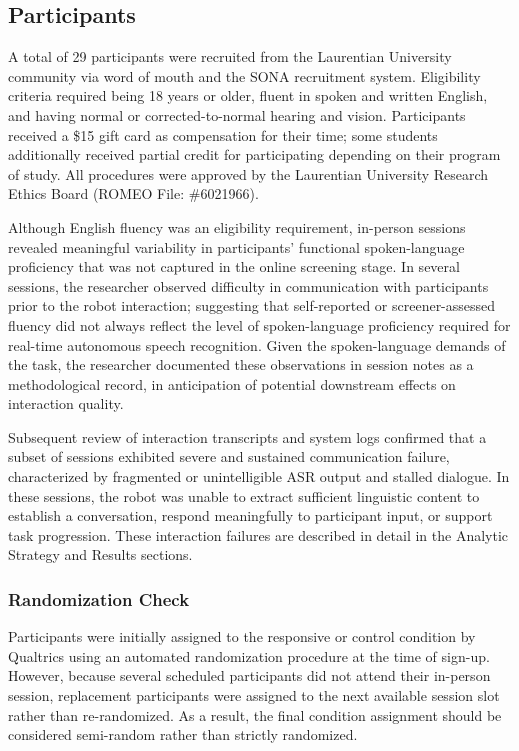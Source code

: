 \documentclass[
]{article}
\begin{document}
\subsection{Participants}\label{sec-participants}

A total of 29 participants were recruited from the Laurentian University
community via word of mouth and the SONA recruitment system. Eligibility
criteria required being 18 years or older, fluent in spoken and written
English, and having normal or corrected-to-normal hearing and vision.
Participants received a \$15 gift card as compensation for their time;
some students additionally received partial credit for participating
depending on their program of study. All procedures were approved by the
Laurentian University Research Ethics Board (ROMEO File: \#6021966).

Although English fluency was an eligibility requirement, in-person
sessions revealed meaningful variability in participants' functional
spoken-language proficiency that was not captured in the online
screening stage. In several sessions, the researcher observed difficulty
in communication with participants prior to the robot interaction;
suggesting that self-reported or screener-assessed fluency did not
always reflect the level of spoken-language proficiency required for
real-time autonomous speech recognition. Given the spoken-language
demands of the task, the researcher documented these observations in
session notes as a methodological record, in anticipation of potential
downstream effects on interaction quality.

Subsequent review of interaction transcripts and system logs confirmed
that a subset of sessions exhibited severe and sustained communication
failure, characterized by fragmented or unintelligible ASR output and
stalled dialogue. In these sessions, the robot was unable to extract
sufficient linguistic content to establish a conversation, respond
meaningfully to participant input, or support task progression. These
interaction failures are described in detail in the Analytic Strategy
and Results sections.

\subsubsection{Randomization Check}\label{randomization-check}

Participants were initially assigned to the responsive or control
condition by Qualtrics using an automated randomization procedure at the
time of sign-up. However, because several scheduled participants did not
attend their in-person session, replacement participants were assigned
to the next available session slot rather than re-randomized. As a
result, the final condition assignment should be considered semi-random
rather than strictly randomized.
\end{document}
